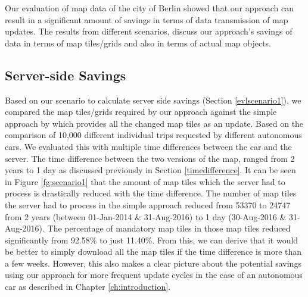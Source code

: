 Our evaluation of map data of the city of Berlin showed that our approach can result in a significant amount of savings in terms of data transmission of map updates. The results from different scenarios, discuss our approach's savings of data in terms of map tiles/grids and also in terms of actual map objects. 





\subsection{Server-side Savings}
Based on our scenario to calculate server side savings (Section \ref{evlscenario1}), we compared the map tiles/grids required by our approach against the simple approach by \citet{bastiaensen2003actmap} which provides all the changed map tiles as an update. Based on the comparison of 10,000 different individual trips requested by different autonomous cars. We evaluated this with multiple time differences between the car and the server. 
The time difference between the two versions of the map, ranged from 2 years to 1 day as discussed previously in Section \ref{timedifference}. 
It can be seen in Figure \ref{fg:scenario1} that the amount of map tiles which the server had to process is drastically reduced with the time difference. The number of map tiles the server had to process in the simple approach reduced from 53370 to 24747 from 2 years (between 01-Jan-2014 \& 31-Aug-2016) to 1 day (30-Aug-2016 \& 31-Aug-2016). The percentage of mandatory map tiles in those map tiles reduced significantly from 92.58\% to just 11.40\%. From this, we can derive that it would be better to simply download all the map tiles if the time difference is more than a few weeks. However, this also makes a clear picture about the potential savings using our approach for more frequent update cycles in the case of an autonomous car as described in Chapter \ref{ch:introduction}. \\


